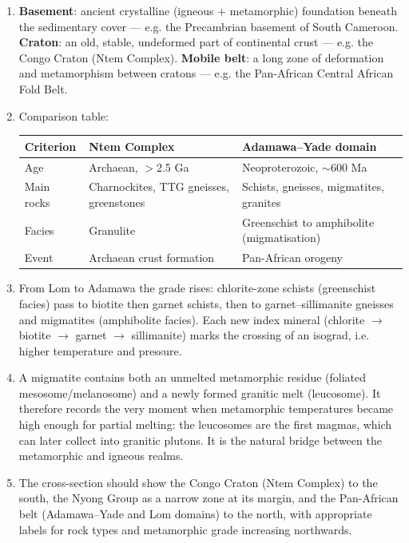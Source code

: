 \documentclass[11pt]{article}
\begin{document}
\begin{corrige}
\begin{enumerate}
\item \textbf{Basement}: ancient crystalline (igneous + metamorphic) foundation beneath the sedimentary cover --- e.g. the Precambrian basement of South Cameroon. \textbf{Craton}: an old, stable, undeformed part of continental crust --- e.g. the Congo Craton (Ntem Complex). \textbf{Mobile belt}: a long zone of deformation and metamorphism between cratons --- e.g. the Pan-African Central African Fold Belt.
\item Comparison table:
\begin{center}
\begin{tabularx}{\linewidth}{|l|X|X|}
\hline
\rowcolor{popblueL} \textbf{Criterion} & \textbf{Ntem Complex} & \textbf{Adamawa--Yade domain} \\
\hline
Age & Archaean, $>$2.5 Ga & Neoproterozoic, $\sim$600 Ma \\
\hline
Main rocks & Charnockites, TTG gneisses, greenstones & Schists, gneisses, migmatites, granites \\
\hline
Facies & Granulite & Greenschist to amphibolite (migmatisation) \\
\hline
Event & Archaean crust formation & Pan-African orogeny \\
\hline
\end{tabularx}
\end{center}
\item From Lom to Adamawa the grade rises: chlorite-zone schists (greenschist facies) pass to biotite then garnet schists, then to garnet--sillimanite gneisses and migmatites (amphibolite facies). Each new index mineral (chlorite $\rightarrow$ biotite $\rightarrow$ garnet $\rightarrow$ sillimanite) marks the crossing of an isograd, i.e. higher temperature and pressure.
\item A migmatite contains both an unmelted metamorphic residue (foliated mesosome/melanosome) and a newly formed granitic melt (leucosome). It therefore records the very moment when metamorphic temperatures became high enough for partial melting: the leucosomes are the first magmas, which can later collect into granitic plutons. It is the natural bridge between the metamorphic and igneous realms.
\item The cross-section should show the Congo Craton (Ntem Complex) to the south, the Nyong Group as a narrow zone at its margin, and the Pan-African belt (Adamawa--Yade and Lom domains) to the north, with appropriate labels for rock types and metamorphic grade increasing northwards.
\end{enumerate}
\end{corrige}
\end{document}
